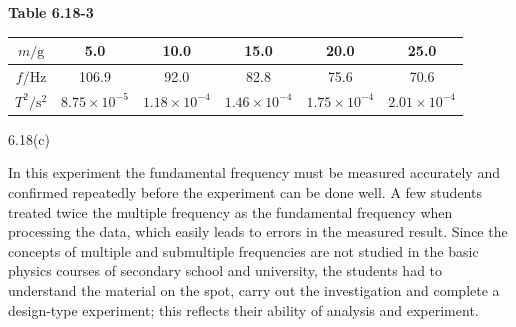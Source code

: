 \begin{center}
\begin{minipage}{\linewidth}
\centering
\textbf{Table 6.18-3}\\[3pt]
\begin{tabular}{cccccc}
\toprule
$m/\mathrm{g}$ & 5.0 & 10.0 & 15.0 & 20.0 & 25.0\\
\midrule
$f/\mathrm{Hz}$ & 106.9 & 92.0 & 82.8 & 75.6 & 70.6\\
$T^{2}/\mathrm{s^{2}}$ & $8.75\times10^{-5}$ & $1.18\times10^{-4}$ & $1.46\times10^{-4}$ & $1.75\times10^{-4}$ & $2.01\times10^{-4}$\\
\bottomrule
\end{tabular}
\end{minipage}
\end{center}

\begin{figbox}{6.18(c)}
\end{figbox}

\begin{commentary}
In this experiment the fundamental frequency must be measured accurately and confirmed repeatedly before the experiment can be done well. A few students treated twice the multiple frequency as the fundamental frequency when processing the data, which easily leads to errors in the measured result. Since the concepts of multiple and submultiple frequencies are not studied in the basic physics courses of secondary school and university, the students had to understand the material on the spot, carry out the investigation and complete a design-type experiment; this reflects their ability of analysis and experiment.
\end{commentary}
